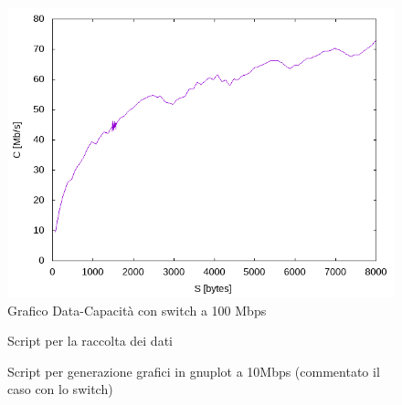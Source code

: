 \documentclass{exam}
\begin{document}
\begin{figure}[h!]
	\centering
	\includegraphics[scale = 0.75]{Si_Switch/speed-100Mbps.png}
	\caption{Grafico Data-Capacità  con switch a 100 Mbps}
	\label{fig:3.2Speed}
\end{figure}


\begin{figure}[h!]
	\centering
	
	\caption{Script per la raccolta dei dati}
	\label{fig:ScriptPing}
\end{figure}

\begin{figure}[]
	\centering
	
	\caption{Script per generazione grafici in gnuplot a 10Mbps (commentato il caso con lo switch)}
	\label{fig:ScriptPlot}
\end{figure}
\end{document}
